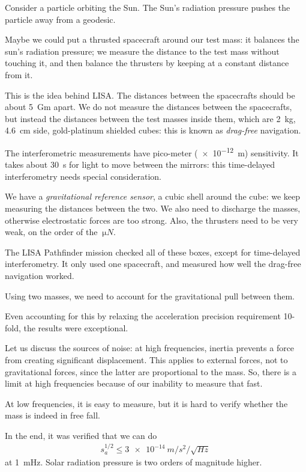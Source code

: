 \documentclass[main.tex]{subfiles}
\begin{document}
Consider a particle orbiting the Sun. 
The Sun's radiation pressure pushes the particle away from a geodesic. 

Maybe we could put a thrusted spacecraft around our test mass: it balances the sun's radiation pressure; we measure the distance to the test mass without touching it, and then balance the thrusters by keeping at a constant distance from it.

This is the idea behind LISA. 
The distances between the spacecrafts should be about \SI{5}{Gm} apart.
We do not measure the distances between the spacecrafts, but instead the distances between the test masses inside them, which are \SI{2}{kg}, \SI{4.6}{cm} side, gold-platinum shielded cubes: this is known as \emph{drag-free} navigation. 

The interferometric measurements have pico-meter (\SI{e-12}{m}) sensitivity. 
It takes about \SI{30}{s} for light to move between the mirrors: this time-delayed interferometry needs special consideration. 

We have a \emph{gravitational reference sensor}, a cubic shell around the cube: we keep measuring the distances between the two. 
We also need to discharge the masses, otherwise electrostatic forces are too strong.  
Also, the thrusters need to be very weak, on the order of the \(\SI{}{\micro N }\). 

The LISA Pathfinder mission checked all of these boxes, except for time-delayed interferometry. 
It only used one spacecraft, and measured how well the drag-free navigation worked. 

Using two masses, we need to account for the gravitational pull between them. 

Even accounting for this by relaxing the acceleration precision requirement 10-fold, the results were exceptional. 

Let us discuss the sources of noise: at high frequencies, inertia prevents a force from creating significant displacement. 
This applies to external forces, not to gravitational forces, since the latter are proportional to the mass. 
So, there is a limit at high frequencies because of our inability to measure that fast. 

At low frequencies, it is easy to measure, but it is hard to verify whether the mass is indeed in free fall. 

In the end, it was verified that we can do 
%
\begin{align}
s^{1/2}_{a} \leq \SI{3e-14}{m / s^2 / \sqrt{Hz}}
\,
\end{align}
%
at \SI{1}{mHz}. Solar radiation pressure is two orders of magnitude higher. 
\end{document}
